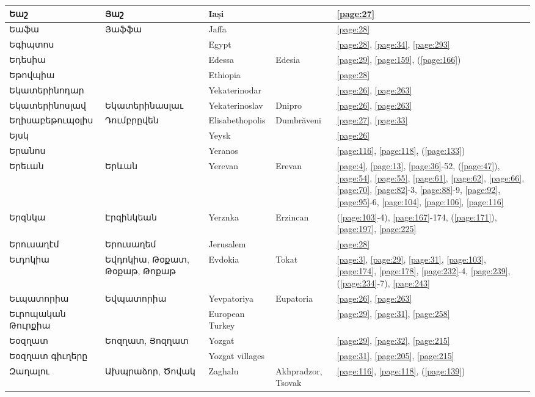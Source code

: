 \begin{center}
\begin{longtable}{|p{}|p{3cm}|p{3cm}|p{2cm}|p{3cm}|}
Եաշ&Յաշ &Iași & &\ref{page:27}\\ \hline
Եաֆա&Յաֆֆա & Jaffa& &\ref{page:28}\\ \hline
Եգիպտոս& & Egypt& &\ref{page:28}, \ref{page:34}, \ref{page:293}\\ \hline
Եդեսիա& & Edessa&Edesia &\ref{page:29}, \ref{page:159}, (\ref{page:166})\\ \hline
Եթովպիա& &Ethiopia & &\ref{page:28}\\ \hline
Եկատերինոդար& &Yekaterinodar & &\ref{page:26}, \ref{page:263}\\ \hline
Եկատերինոսլավ& Եկատերինասլաւ &Yekaterinoslav & Dnipro&\ref{page:26}, \ref{page:263}\\ \hline
Եղիսաբեթուպօլիս &Դումբրըվեն &Elisabethopolis  &Dumbrăveni &\ref{page:27}, \ref{page:33}\\ \hline
Եյսկ& & Yeysk& &\ref{page:26}\\ \hline
Երանոս& &Yeranos & &\ref{page:116}, \ref{page:118}, (\ref{page:133})\\ \hline
Երեւան&Երևան &Yerevan &Erevan &\ref{page:4}, \ref{page:13}, \ref{page:36}-52, (\ref{page:47}), \ref{page:54}, \ref{page:55}, \ref{page:61}, \ref{page:62}, \ref{page:66}, \ref{page:70}, \ref{page:82}-3, \ref{page:88}-9, \ref{page:92}, \ref{page:95}-6, \ref{page:104}, \ref{page:106}, \ref{page:116}\\ \hline
Երզնկա&Էրզինկեան & Yerznka&Erzincan     &(\ref{page:103}-4), \ref{page:167}-174, (\ref{page:171}), \ref{page:197}, \ref{page:225}\\ \hline
Երուսաղէմ& Երուսաղեմ& Jerusalem& &\ref{page:28}\\ \hline
Եւդոկիա  &Եվդոկիա,  Թօքատ, Թօքաթ, Թոքաթ& Evdokia & Tokat &\ref{page:3}, \ref{page:29}, \ref{page:31}, \ref{page:103}, \ref{page:174}, \ref{page:178}, \ref{page:232}-4, \ref{page:239}, (\ref{page:234}-7), \ref{page:243}\\ \hline
Եւպատորիա& Եվպատորիա&Yevpatoriya & Eupatoria&\ref{page:26}, \ref{page:263}\\ \hline
Եւրոպական Թուրքիա& &European Turkey & &\ref{page:29}, \ref{page:31}, \ref{page:258}\\ \hline
Եօզղատ&Եոզղատ,   Յոզղատ  &Yozgat & &\ref{page:29}, \ref{page:32}, \ref{page:215}\\ \hline
Եօզղատ գիւղերը& &Yozgat villages & &\ref{page:31}, \ref{page:205}, \ref{page:215}\\ \hline
Զաղալու& Ախպրաձոր, Ծովակ& Zaghalu&Akhpradzor, Tsovak &\ref{page:116}, \ref{page:118}, (\ref{page:139})\\ \hline

\end{longtable}
\end{center}
